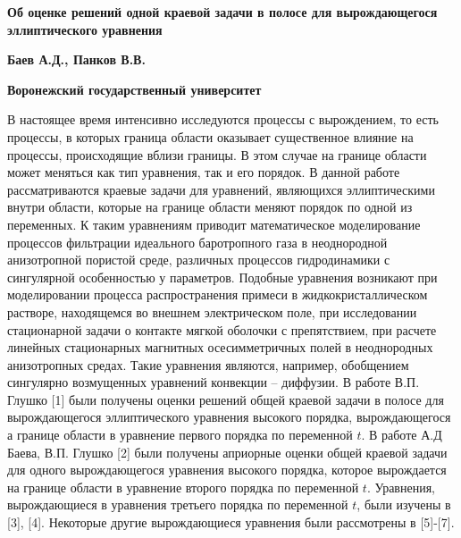 \begin{center}
\textbf{Об оценке решений одной краевой задачи в полосе для вырождающегося
эллиптического уравнения}
\end{center}

\begin{center}
\textbf{Баев А.Д., Панков В.В. }
\end{center}

\begin{center}
\textbf{Воронежский государственный университет}
\end{center}





В настоящее время интенсивно исследуются процессы с вырождением, то есть
процессы, в которых граница области оказывает существенное влияние на
процессы, происходящие вблизи границы. В этом случае на границе области
может меняться как тип уравнения, так и его порядок. В данной работе
рассматриваются краевые задачи для уравнений, являющихся эллиптическими
внутри области, которые на границе области меняют порядок по одной из
переменных. К таким уравнениям приводит математическое моделирование
процессов фильтрации идеального баротропного газа в неоднородной
анизотропной пористой среде, различных процессов гидродинамики с сингулярной
особенностью у параметров. Подобные уравнения возникают при моделировании
процесса распространения примеси в жидкокристаллическом растворе,
находящемся во внешнем электрическом поле, при исследовании стационарной
задачи о контакте мягкой оболочки с препятствием, при расчете линейных
стационарных магнитных осесимметричных полей в неоднородных анизотропных
средах. Такие уравнения являются, например, обобщением сингулярно
возмущенных уравнений конвекции -- диффузии. В работе В.П. Глушко [1] были
получены оценки решений общей краевой задачи в полосе для вырождающегося
эллиптического уравнения высокого порядка, вырождающегося а границе области
в уравнение первого порядка по переменной $t$. В работе А.Д Баева, В.П.
Глушко [2] были получены априорные оценки общей краевой задачи для одного
вырождающегося уравнения высокого порядка, которое вырождается на границе
области в уравнение второго порядка по переменной $t$. Уравнения,
вырождающиеся в уравнения третьего порядка по переменной $t$, были изучены в
[3], [4]. Некоторые другие вырождающиеся уравнения были рассмотрены в
[5]-[7].

